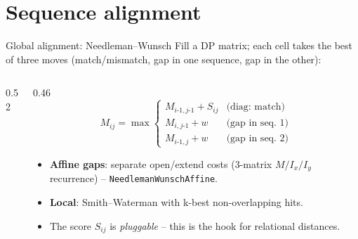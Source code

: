 \documentclass[aspectratio=169,10pt]{beamer}
\newcommand{\code}[1]{\texttt{\small #1}}
\begin{document}
\section{Sequence alignment}
\begin{frame}{Global alignment: Needleman--Wunsch}
  Fill a DP matrix; each cell takes the best of three moves
  (match/mismatch, gap in one sequence, gap in the other):
  \vspace{0.5em}
  \begin{columns}[c]
    \begin{column}{0.52\textwidth}
      \centering
    \end{column}
    \begin{column}{0.46\textwidth}
      \[
        M_{ij}=\max\!\begin{cases}
          M_{i\text{-}1,j\text{-}1}+S_{ij} & \text{(diag: match)}\\[2pt]
          M_{i,j\text{-}1}+w & \text{(gap in seq.\ 1)}\\[2pt]
          M_{i\text{-}1,j}+w & \text{(gap in seq.\ 2)}
        \end{cases}
      \]
      \vspace{0.4em}
      \small
      \begin{itemize}
        \item \textbf{Affine gaps}: separate open/extend costs (3-matrix
              $M/I_x/I_y$ recurrence) -- \code{NeedlemanWunschAffine}.
        \item \textbf{Local}: Smith--Waterman with k-best non-overlapping hits.
        \item The score $S_{ij}$ is \emph{pluggable} -- this is the hook for
              relational distances.
      \end{itemize}
    \end{column}
  \end{columns}
\end{frame}
\end{document}
